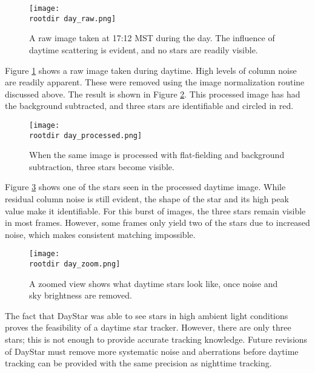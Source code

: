 \documentclass[twocolumn,letterpaper]{IEEEAerospace2012}
\newcommand{\rootdir}{./Figures/}
\begin{document}
\begin{figure}[H]
    \centering
    \texttt{[image: \\rootdir day\_raw.png]}
    \caption{A raw image taken at 17:12 MST during the day. The influence of daytime scattering is evident, and no stars are readily visible.}
    \label{fig:day_raw}
\end{figure}

Figure \ref{fig:day_raw} shows a raw image taken during daytime. High levels of column noise are readily apparent. These were removed using the image normalization routine discussed above. The result is shown in Figure \ref{fig:day_processed}. This processed image has had the background subtracted, and three stars are identifiable and circled in red.
\begin{figure}[H]
    \centering
    \texttt{[image: \\rootdir day\_processed.png]}
    \caption{When the same image is processed with flat-fielding and background subtraction, three stars become visible.}
    \label{fig:day_processed}
\end{figure}

Figure \ref{fig:day_zoom} shows one of the stars seen in the processed daytime image. While residual column noise is still evident, the shape of the star and its high peak value make it identifiable. For this burst of images, the three stars remain visible in most frames. However, some frames only yield two of the stars due to increased noise, which makes consistent matching impossible.

\begin{figure}[H]
    \centering
    \texttt{[image: \\rootdir day\_zoom.png]}
    \caption{A zoomed view shows what daytime stars look like, once noise and sky brightness are removed.}
    \label{fig:day_zoom}
\end{figure}

The fact that DayStar was able to see stars in high ambient light conditions proves the feasibility of a daytime star tracker. However, there are only three stars; this is not enough to provide accurate tracking knowledge. Future revisions of DayStar must remove more systematic noise and aberrations before daytime tracking can be provided with the same precision as nighttime tracking.


\end{document}
